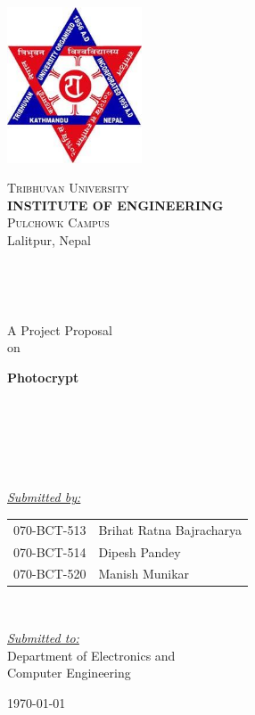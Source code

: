 \begin{titlepage}
    \centering
    \includegraphics[width=0.3\textwidth]{images/tu-logo.png}

    \LARGE
    \textsc{Tribhuvan University} \\[5pt]
    \Large
    \textbf{INSTITUTE OF ENGINEERING}\\
    \Large
    \textsc{Pulchowk Campus} \\
    \large
    Lalitpur, Nepal

    ~

    ~

    {\Large A Project Proposal\\on}

    {\Huge \bf Photocrypt}

    ~

    ~ 

    ~

    \textit{\uline{Submitted by:}} \\
    \begin{tabular}{r|l}
        {\small 070-BCT-513} & Brihat Ratna Bajracharya\\
        {\small 070-BCT-514} & Dipesh Pandey\\
        {\small 070-BCT-520} & Manish Munikar\\
    \end{tabular}

    ~

    \textit{\uline{Submitted to:}} \\
    Department of Electronics and\\Computer Engineering

    \vfill
    \today
\end{titlepage}
